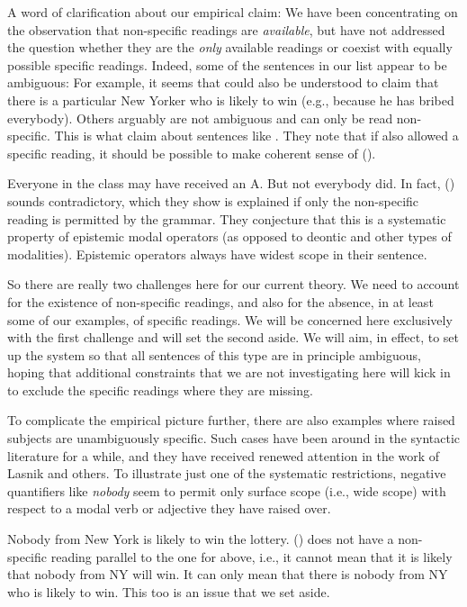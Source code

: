 A word of clarification about our empirical claim: We have been concentrating on
the observation that non-specific readings are \emph{available}, but have not
addressed the question whether they are the \emph{only} available readings or
coexist with equally possible specific readings. Indeed, some of the sentences
in our list appear to be ambiguous: For example, it seems that  could
also be understood to claim that there is a particular New Yorker who is likely
to win (e.g., because he has bribed everybody). Others arguably are not
ambiguous and can only be read non-specific. This is what
\citet{fintel-iatridou-2003-ec} claim about sentences like . They
note that if  also allowed a specific reading, it should be
possible to make coherent sense of (\nextx).

\ex Everyone in the class may have received an A. But not everybody did. \xe
%
%
In fact, (\lastx) sounds contradictory, which they show is explained if only the
non-specific reading is permitted by the grammar. They conjecture that this is a
systematic property of epistemic modal operators (as opposed to deontic and
other types of modalities). Epistemic operators always have widest scope in
their sentence.

So there are really two challenges here for our current theory. We need to
account for the existence of non-specific readings, and also for the absence, in
at least some of our examples, of specific readings. We will be concerned here
exclusively with the first challenge and will set the second aside. We will aim,
in effect, to set up the system so that all sentences of this type are in
principle ambiguous, hoping that additional constraints that we are not
investigating here will kick in to exclude the specific readings where they are
missing.

To complicate the empirical picture further, there are also examples where
raised subjects are unambiguously specific. Such cases have been around in the
syntactic literature for a while, and they have received renewed attention in
the work of Lasnik and others. To illustrate just one of the systematic
restrictions, negative quantifiers like \emph{nobody} seem to permit only
surface scope (i.e., wide scope) with respect to a modal verb or adjective they
have raised over.

\ex Nobody from New York is likely to win the lottery. \xe
%
%
(\lastx) does not have a non-specific reading parallel to the one for
 above, i.e., it cannot mean that it is likely that nobody from NY
will win. It can only mean that there is nobody from NY who is likely to win.
This too is an issue that we set aside.

